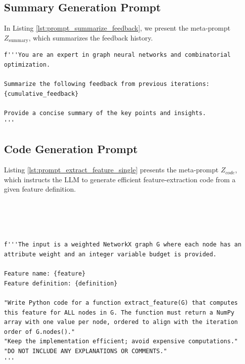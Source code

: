 \subsection{Summary Generation Prompt}
\label{appendix:summary_generation_prompt}

In Listing \ref{lst:prompt_summarize_feedback}, we present the meta-prompt $Z_{\text{summary}}$, which summarizes the feedback history.

\begin{listing}[h]
\caption{Prompt for summarizing feedback from previous iterations.}
\label{lst:prompt_summarize_feedback}
\begin{verbatim}
f'''You are an expert in graph neural networks and combinatorial optimization.

Summarize the following feedback from previous iterations:
{cumulative_feedback}

Provide a concise summary of the key points and insights.
'''
\end{verbatim}
\end{listing}


\subsection{Code Generation Prompt}
\label{appendix:code_generation_prompt}

Listing \ref{lst:prompt_extract_feature_single} presents the meta-prompt 
$Z_{code}$, which instructs the LLM to generate efficient feature-extraction code from a given feature definition.



\begin{listing}[!ht]
\caption{Prompt for generating feature-extraction code.}
\label{lst:prompt_extract_feature_single}
\begin{verbatim}




f'''The input is a weighted NetworkX graph G where each node has an attribute weight and an integer variable budget is provided.

Feature name: {feature}
Feature definition: {definition}

"Write Python code for a function extract_feature(G) that computes this feature for ALL nodes in G. The function must return a NumPy array with one value per node, ordered to align with the iteration order of G.nodes()."
"Keep the implementation efficient; avoid expensive computations."
"DO NOT INCLUDE ANY EXPLANATIONS OR COMMENTS."
'''
\end{verbatim}
\end{listing}



